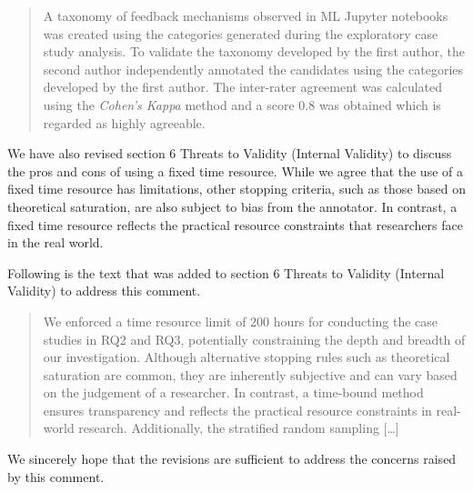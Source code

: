 \documentclass[11pt,fleqn]{article}
\begin{document}
\begin{quote}
  A taxonomy of feedback mechanisms observed in ML Jupyter notebooks was created using the categories generated during the exploratory case study analysis. To validate the taxonomy developed by the first author, the second author independently annotated the candidates using the categories developed by the first author. The inter-rater agreement was calculated using the \emph{Cohen's Kappa} method and a score 0.8 was obtained which is regarded as highly agreeable.
\end{quote}

We have also revised section 6 Threats to Validity (Internal Validity) to discuss the pros and cons of using a fixed time resource. While we agree that the use of a fixed time resource has limitations, other stopping criteria, such as those based on theoretical saturation, are also subject to bias from the annotator. In contrast, a fixed time resource reflects the practical resource constraints that researchers face in the real world.

Following is the text that was added to section 6 Threats to Validity (Internal Validity) to address this comment.

\begin{quote}
  We enforced a time resource limit of 200 hours for conducting the case studies in RQ2 and RQ3, potentially constraining the depth and breadth of our investigation. Although alternative stopping rules such as theoretical saturation are common, they are inherently subjective and can vary based on the judgement of a researcher. In contrast, a time-bound method ensures transparency and reflects the practical resource constraints in real-world research. Additionally, the stratified random sampling [\ldots]
\end{quote}

We sincerely hope that the revisions are sufficient to address the concerns raised by this comment.
\end{document}

